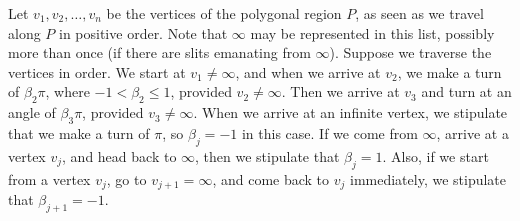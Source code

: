 \documentclass[11pt]{book}
\theoremstyle{definition}
\begin{document}
\begin{enumerate}
	Let $v_1, v_2, \ldots, v_n$ be the vertices of the polygonal region $P$, as seen as we travel along $P$ in positive order.  Note that $\infty$ may be represented in this list, possibly more than once (if there are slits emanating from $\infty$).   Suppose we traverse the vertices in order.  We start at $v_1 \neq \infty$, and when we arrive at $v_2$, we make a turn of $\beta_2\pi$, where $-1 < \beta_2 \leq 1$, provided $v_2\neq \infty$.  Then we arrive at $v_3$ and turn at an angle of $\beta_3\pi$, provided $v_3\neq \infty$.   When we arrive at an infinite vertex, we stipulate that we make a turn of $\pi$, so $\beta_j=-1$ in this case.  If we come from $\infty$, arrive at a vertex $v_j$, and head back to $\infty$, then we stipulate that $\beta_j = 1$.   Also, if we start from a vertex $v_j$, go to $v_{j+1} = \infty$, and come back to $v_j$ immediately, we stipulate that $\beta_{j+1} = -1$. 


\end{enumerate}
\end{document}
